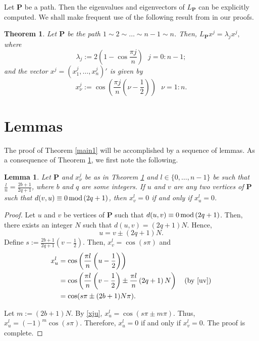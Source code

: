 \documentclass[preprint,12pt]{elsarticle}
\newcommand{\1}{\mathbf{1}}
\newcommand{\0}{\mathbf{0}}
\newcommand{\p}{{\mathbf{P}}}
\def\p{\mathbf{P}}
\newtheorem{theorem}{Theorem}
\newtheorem{lemma}{Lemma}
\begin{document}
Let $\p$ be a path. Then the
eigenvalues and eigenvectors of $L_{\p}$ can be explicitly computed.
We shall make frequent use of the following result from \cite{notes} in our proofs.
\begin{theorem}\label{th1}
    Let $\p$ be the path $1 \sim 2 \sim \dotsc \sim n-1 \sim n$.
    Then,
    \(L_\p x^j=\lambda_j x^j,\)
    where 
    \begin{equation} \label{pn}
    \lambda_j:=2\left(1-\cos \frac{\pi j}{n}\right) ~~~j=0:n-1;
    \end{equation}
    and the vector $x^j=(x^j_{1},\dotsc,x^j_{n})'$ is given by
    \begin{equation} \label{xj}
    x^j_\nu:=\cos \left(\frac{\pi j}{n} \left (\nu-\frac{1}{2}\right ) \right) ~~~\nu=1:n.
    \end{equation}
\end{theorem}

\section{Lemmas}
The proof of Theorem \ref{main1} will be accomplished by
a sequence of lemmas.
As a consequence of Theorem \ref{th1}, we first note the following.
\begin{lemma}\label{lem1}
Let $\p$ and $x_{\nu}^j$ be as in Theorem \ref{th1} and
$l \in \{0,\dotsc,n-1\}$ be such that
$\frac{l}{n}=\frac{2b+1}{2q+1}$,
where $b$ and $q$ are some integers.
If $u$ and $v$ are any two vertices of $\p$ such that
    $d(v,u) \equiv 0\,{\rm{mod}}\,(2q+1)$,
then $x^l_v=0$ if and only if $x^l_u=0$. 
\end{lemma}

\begin{proof}
Let $u$ and $v$ be vertices of $\p$ such that $d(u,v) \equiv 0\,{\rm mod}\, (2q+1)$.
Then, there exists an integer $N$ such that $d(u,v)=(2q+1)N$. Hence,
\begin{equation} \label{uv}
u=v \pm (2q+1)N.
\end{equation}
Define $s:=\frac{2b+1}{2q+1}\left(v-\frac{1}{2}\right)$.
Then, $x^{l}_v=\cos (s \pi)$ and
    \begin{align}\label{xju}
x^l_u&=\cos \left(\frac{\pi l}{n}\left(u-\frac{1}{2}\right)\right) \notag \\
&=\cos \left(\frac{\pi l}{n} \left(v-\frac{1}{2}\right) \pm \frac{\pi l}{n}\left(2q+1\right)N\right)~~~(\mbox{by}~\eqref{uv})  \\
&=\cos(s \pi \pm (2b+1)N \pi). \notag 
\end{align}

Let $m:=(2b+1)N$.
    By \eqref{xju},
 $x^{l}_u= \cos (s \pi \pm m \pi)$.
    Thus, $x^l_u=(-1)^m \cos (s \pi)$.
        Therefore, $x^l_u=0$ if and only if $x^l_v=0$.
The proof is complete.
\end{proof}
\end{document}
